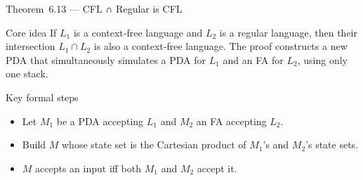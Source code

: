 \begin{frame}[t]{Theorem 6.13 — CFL ∩ Regular is CFL}
  \begin{tblock}{Core idea}
    If $L_1$ is a context‑free language and $L_2$ is a regular language,
    then their intersection $L_1 \cap L_2$ is also a context‑free
    language.  The proof constructs a new PDA that simultaneously
    simulates a PDA for $L_1$ and an FA for $L_2$, using only one
    stack.
  \end{tblock}
  \begin{tblock}{Key formal steps}
    \begin{itemize}
      \item Let $M_1$ be a PDA accepting $L_1$ and $M_2$ an FA
        accepting $L_2$.
      \item Build $M$ whose state set is the Cartesian product of
        $M_1$’s and $M_2$’s state sets.
      \item $M$ accepts an input iff both $M_1$ and $M_2$ accept it.
    \end{itemize}
  \end{tblock}
  \label{fr:6.2-14}
\end{frame}

